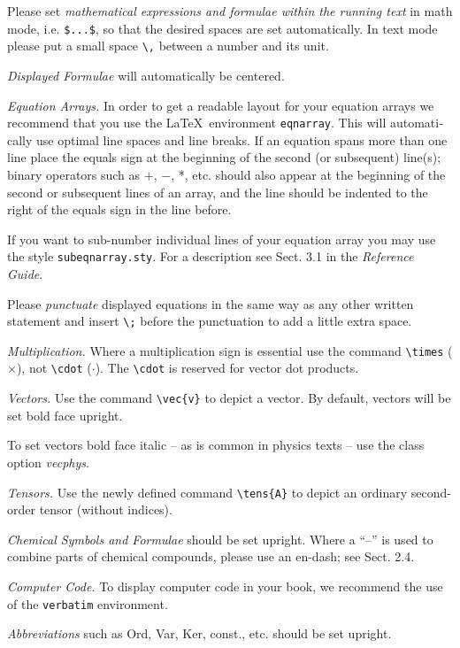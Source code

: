 \documentclass[graybox]{svmono}
\begin{document}
Please set {\it mathematical expressions and formulae within the running text} in math mode, i.e. \verb|$...$|, so that the desired spaces are set automatically. In text mode please put a small space \verb|\,| between a number and its unit.

{\it Displayed Formulae} will automatically be centered.

{\it Equation Arrays.} In order to get a readable layout for your equation arrays we recommend that you use the \LaTeX~environment \verb|eqnarray|. This will automati­cally use optimal line spaces and line breaks. If an equation spans more than one line place the equals sign at the beginning of the second (or subsequent) line(s); binary operators such as $+$, $-$, *, etc. should also appear at the beginning of the second or subsequent lines of an array, and the line should be indented to the right of the equals sign in the line before.

If you want to sub-number individual lines of your equation array you may use the style \verb|subeqnarray.sty|. For a description see Sect. 3.1 in the {\it Reference Guide}.

Please {\it punctuate} displayed equations in the same way as any other written statement and insert \verb|\;| before the punctuation to add a little extra space.


{\it Multiplication.} Where a multiplication sign is essential use the command \verb|\times| ($\times$), not \verb|\cdot| ($\cdot$). The \verb|\cdot| is reserved for vector dot products.

{\it Vectors.} Use the command \verb|\vec{v}| to depict a vector. By default, vectors will be set bold face upright.

To set vectors bold face italic -- as is common in physics texts -- use the class option {\it vecphys}.

{\it Tensors.} Use the newly defined command \verb|\tens{A}| to depict an ordinary second-order tensor (without indices).

{\it Chemical Symbols and Formulae} should be set upright. Where a ``--'' is used to combine parts of chemical compounds, please use an en-dash; see Sect. 2.4.

{\it Computer Code.} To display computer code in your book, we recommend the use of the \verb|verbatim| environment.

{\it Abbreviations} such as Ord, Var, Ker, const., etc. should be set upright.
\end{document}
